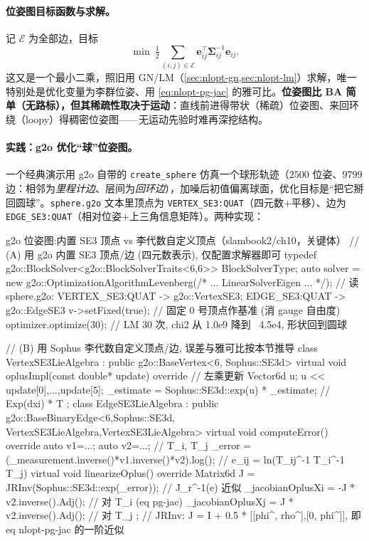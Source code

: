 \paragraph{位姿图目标函数与求解。}\cite{gaoxiang2019slam14}
记 $\mathcal{E}$ 为全部边，目标
\begin{equation}
  \min\ \tfrac12\sum_{(i,j)\in\mathcal{E}}\mathbf{e}_{ij}^\top\boldsymbol{\Sigma}_{ij}^{-1}\mathbf{e}_{ij}.
  \label{eq:nlopt-pg-cost}
\end{equation}
这又是一个最小二乘，照旧用 GN/LM（\cref{sec:nlopt-gn,sec:nlopt-lm}）求解，唯一特别处是优化变量为李群位姿、用 \cref{eq:nlopt-pg-jac} 的雅可比。\textbf{位姿图比 BA 简单（无路标），但其稀疏性取决于运动}：直线前进得带状（稀疏）位姿图、来回环绕（loopy）得稠密位姿图——无运动先验时难再深挖结构。

\paragraph{实践：g2o 优化“球”位姿图。}\cite{gaoxiang2019slam14}
一个经典演示用 g2o 自带的 \texttt{create\_sphere} 仿真一个球形轨迹（$2500$ 位姿、$9799$ 边：相邻为\emph{里程计边}、层间为\emph{回环边}），加噪后初值偏离球面，优化目标是“把它掰回圆球”\cite{gaoxiang2019slam14}。\texttt{sphere.g2o} 文本里顶点为 \texttt{VERTEX\_SE3:QUAT}（四元数$+$平移）、边为 \texttt{EDGE\_SE3:QUAT}（相对位姿$+$上三角信息矩阵）。两种实现：

\begin{codebox}[C++]{g2o 位姿图:内置 SE3 顶点 vs 李代数自定义顶点（slambook2/ch10，关键体）}
// (A) 用 g2o 内置 SE3 顶点/边 (四元数表示), 仅配置求解器即可
typedef g2o::BlockSolver<g2o::BlockSolverTraits<6,6>> BlockSolverType;
auto solver = new g2o::OptimizationAlgorithmLevenberg(/* ... LinearSolverEigen ... */);
// 读 sphere.g2o: VERTEX_SE3:QUAT -> g2o::VertexSE3; EDGE_SE3:QUAT -> g2o::EdgeSE3
v->setFixed(true);            // 固定 0 号顶点作基准 (消 gauge 自由度)
optimizer.optimize(30);       // LM 30 次, chi2 从 1.0e9 降到 ~4.5e4, 形状回到圆球

// (B) 用 Sophus 李代数自定义顶点/边, 误差与雅可比按本节推导
class VertexSE3LieAlgebra : public g2o::BaseVertex<6, Sophus::SE3d> {
  virtual void oplusImpl(const double* update) override {        // 左乘更新
    Vector6d u; u << update[0],...,update[5];
    _estimate = Sophus::SE3d::exp(u) * _estimate;                // Exp(dxi) * T
  }
};
class EdgeSE3LieAlgebra : public g2o::BaseBinaryEdge<6,Sophus::SE3d,
                              VertexSE3LieAlgebra,VertexSE3LieAlgebra> {
  virtual void computeError() override {
    auto v1=...; auto v2=...;                                    // T_i, T_j
    _error = (_measurement.inverse()*v1.inverse()*v2).log();     // e_ij = ln(T_ij^-1 T_i^-1 T_j)
  }
  virtual void linearizeOplus() override {
    Matrix6d J = JRInv(Sophus::SE3d::exp(_error));               // J_r^{-1}(e) 近似
    _jacobianOplusXi = -J * v2.inverse().Adj();                  // 对 T_i  (eq pg-jac)
    _jacobianOplusXj =  J * v2.inverse().Adj();                  // 对 T_j
  }
};
// JRInv: J = I + 0.5 * [[phi^, rho^],[0, phi^]], 即 eq nlopt-pg-jac 的一阶近似
\end{codebox}


